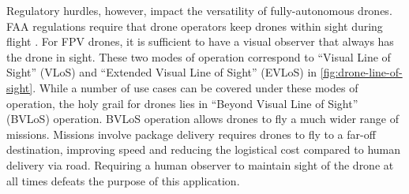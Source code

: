 Regulatory hurdles, however, impact the versatility of fully-autonomous drones.
FAA regulations require that drone operators keep drones within sight during
flight \cite{faa_part107}. For FPV drones, it is sufficient to have a visual
observer that always has the drone in sight.  These two modes of operation
correspond to ``Visual Line of Sight'' (VLoS) and ``Extended Visual Line of
Sight'' (EVLoS) in \cref{fig:drone-line-of-sight}. While a number of use cases
can be covered under these modes of operation, the holy grail for drones lies
in ``Beyond Visual Line of Sight'' (BVLoS) operation. BVLoS operation allows
drones to fly a much wider range of missions. Missions involve package delivery
requires drones to fly to a far-off destination, improving speed and reducing
the logistical cost compared to human delivery via road. Requiring a human
observer to maintain sight of the drone at all times defeats the purpose of
this application.
